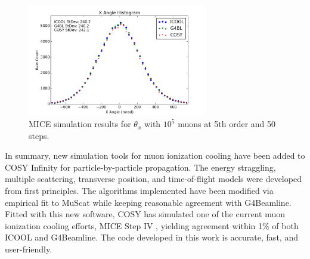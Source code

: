 \begin{figure}[H]
  \centering
    \includegraphics[width=0.7\textwidth]{MICE data/upstream/px} 
  \caption{MICE simulation results for $\theta_x$ with $10^5$ muons at 5th order and 50 steps.}
  \label{fig:uppx}
\end{figure}

\label{sec:summary}

In summary, new simulation tools for muon ionization cooling have been added to COSY Infinity for particle-by-particle propagation. The energy straggling, multiple scattering, transverse position, and time-of-flight models were developed from first principles. The algorithms implemented have been modified via empirical fit to MuScat \cite{muscat} while keeping reasonable agreement with G4Beamline. Fitted with this new software, COSY has simulated one of the current muon ionization cooling efforts, MICE Step IV \cite{mice}, yielding agreement within 1\% of both ICOOL and G4Beamline. The code developed in this work is accurate, fast, and user-friendly.